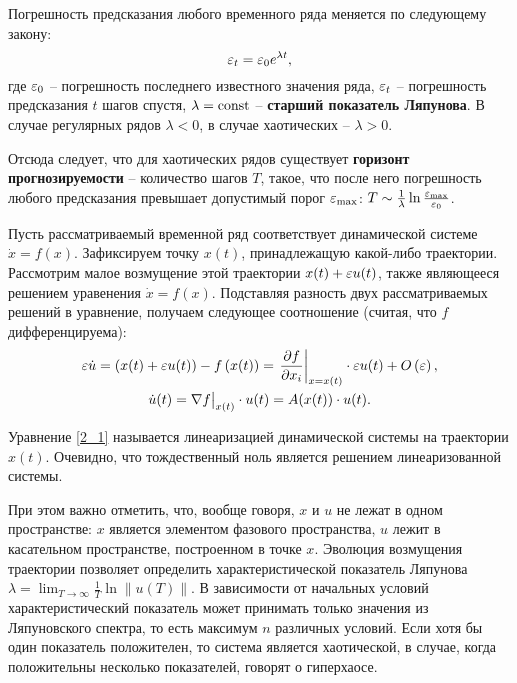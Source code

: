 
Погрешность предсказания любого временного ряда меняется по следующему закону:
\begin{equation*}
    \varepsilon_t = \varepsilon_0 e^{\lambda t},
\end{equation*}
где $\varepsilon_0$ -- погрешность последнего известного значения ряда, $\varepsilon_t$ -- погрешность предсказания $t$ шагов спустя, $\lambda = \mathrm{const}$ -- \textbf{старший показатель Ляпунова}. В случае регулярных рядов $\lambda < 0$, в случае хаотических -- $\lambda > 0$.

Отсюда следует, что для хаотических рядов существует \textbf{горизонт прогнозируемости} -- количество шагов $T$, такое, что после него погрешность любого предсказания превышает допустимый порог $\varepsilon_{\text{max}}$: $T \sim \frac{1}{\lambda} \ln \frac{\varepsilon_{\text{max}}}{\varepsilon_0}$.



Пусть рассматриваемый временной ряд соответствует динамической системе $\dot{x} = f(x)$.
Зафиксируем точку $x(t)$, принадлежащую какой-либо траектории. Рассмотрим малое возмущение этой траектории $x(t) + \varepsilon u(t)$, также являющееся решением уравенения $\dot{x} = f(x)$.
Подставляя разность двух рассматриваемых решений в уравнение, получаем следующее соотношение (считая, что $f$ дифференцируема):
\begin{gather}
\nonumber
    \varepsilon \dot{u} = 
    \left( x(t) + \varepsilon u(t) \right) - f\left( x(t) \right) =
    \left. \frac{\partial f}{\partial x_i} \right|_{x=x(t)} \cdot \varepsilon u(t) + O\left( \varepsilon \right), \\
\label{2_1}
    \dot{u}(t) = \nabla f \big|_{x(t)} \cdot u(t) = A(x(t)) \cdot u(t).
\end{gather}

Уравнение \eqref{2_1} называется линеаризацией динамической системы на траектории $x(t)$.
Очевидно, что тождественный ноль является решением линеаризованной системы.

При этом важно отметить, что, вообще говоря, $x$ и $u$ не лежат в одном пространстве: $x$ является элементом фазового пространства, $u$ лежит в касательном пространстве, построенном в точке $x$.
Эволюция возмущения траектории позволяет определить характеристической показатель Ляпунова $\lambda = \lim_{T \to \infty} \frac{1}{T} \ln \| u(T) \|$.
В зависимости от начальных условий характеристический показатель может принимать только значения из Ляпуновского спектра, то есть максимум $n$ различных условий.
Если хотя бы один показатель положителен, то система является хаотической, в случае, когда положительны несколько показателей, говорят о гиперхаосе.

